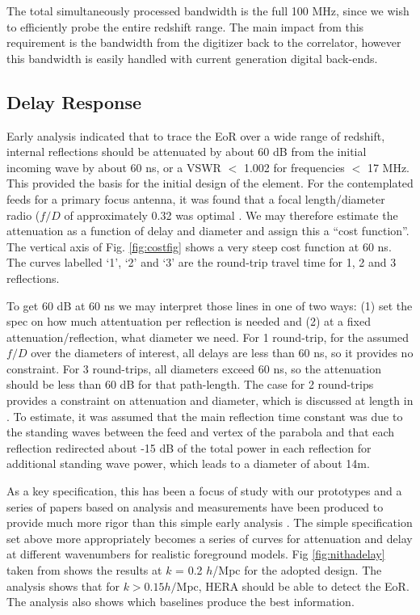 \documentclass[preprint,11pt]{aastex}
\begin{document}
The total simultaneously processed bandwidth is the full 100 MHz, since we wish to efficiently probe the entire redshift range.  The main impact from this requirement is the bandwidth from the digitizer back to the correlator, however this bandwidth is easily handled with current generation digital back-ends.

\subsection{Delay Response}
\label{sec:delayspec}
Early analysis \citep{elementmemo} indicated that to trace the EoR over a wide range of redshift, internal reflections should be attenuated by about 60 dB from the initial incoming wave by about 60 ns, or a VSWR $<$ 1.002 for frequencies $<$ 17 MHz.  This provided the basis for the initial design of the element.    For the contemplated feeds for a primary focus antenna, it was found that a focal length/diameter radio ($f/D$ of approximately 0.32 was optimal \citep{elementmemo}.  We may therefore estimate the attenuation as a function of delay and diameter and assign this a ``cost function''.  The vertical axis of Fig. \ref{fig:costfig} shows a very steep cost function at 60 ns.  The curves labelled `1', `2' and `3' are the round-trip travel time for 1, 2 and 3 reflections.  

To get 60 dB at 60 ns we may interpret those lines in one of two ways:  (1) set the spec on how much attentuation per reflection is needed and (2) at a fixed attenuation/reflection, what diameter we need.  For 1 round-trip, for the assumed $f/D$ over the diameters of interest, all delays are less than 60 ns, so it provides no constraint.  For
3 round-trips, all diameters exceed 60 ns, so the attenuation should be less than 60 dB for that path-length.  The case for 2 round-trips provides a constraint on attenuation and diameter, which is discussed at length in \cite{elementmemo}.
To estimate, it was assumed that the main reflection time constant was due to the standing waves between the feed and vertex of the parabola and that each reflection redirected about -15 dB of the total power in each reflection for additional standing wave power, which leads to a diameter of about 14m.

As a key specification, this has been a focus of study with our prototypes and a series of papers based on analysis and measurements have been produced to provide much more rigor than this simple early analysis \citep{ewall-wice_et_al2016-EoXLimits,neben_et_al2016,thyagarajan_et_al2016,patra_et_al0216}.  The simple specification set above more appropriately becomes a series of curves for attenuation and delay at different wavenumbers for realistic foreground models.  Fig \ref{fig:nithadelay} taken from \cite{thyagarajan_et_al2016} shows the results at $k$ = 0.2 $h$/Mpc for the adopted design.  The analysis shows that for $k>0.15 h/$Mpc, HERA should be able to detect the EoR.  The analysis also shows which baselines produce the best information.
\end{document}
